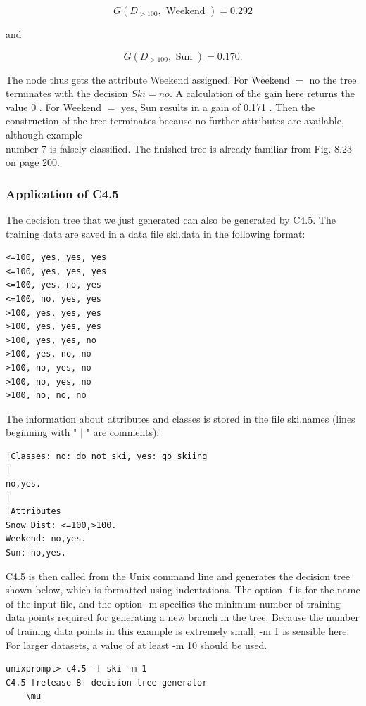 \documentclass[10pt]{book}
\begin{document}
$$
G\left(D_{>100}, \text { Weekend }\right)=0.292
$$

and

$$
G\left(D_{>100}, \text { Sun }\right)=0.170 .
$$

The node thus gets the attribute Weekend assigned. For Weekend $=$ no the tree terminates with the decision $S k i=n o$. A calculation of the gain here returns the value 0 . For Weekend $=$ yes, Sun results in a gain of 0.171 . Then the construction of the tree terminates because no further attributes are available, although example\\
number 7 is falsely classified. The finished tree is already familiar from Fig. 8.23 on page 200.

\subsubsection*{Application of C4.5}
The decision tree that we just generated can also be generated by C4.5. The training data are saved in a data file ski.data in the following format:

\begin{verbatim}
<=100, yes, yes, yes
<=100, yes, yes, yes
<=100, yes, no, yes
<=100, no, yes, yes
>100, yes, yes, yes
>100, yes, yes, yes
>100, yes, yes, no
>100, yes, no, no
>100, no, yes, no
>100, no, yes, no
>100, no, no, no
\end{verbatim}

The information about attributes and classes is stored in the file ski.names (lines beginning with " $\mid$ " are comments):

\begin{verbatim}
|Classes: no: do not ski, yes: go skiing
|
no,yes.
|
|Attributes
Snow_Dist: <=100,>100.
Weekend: no,yes.
Sun: no,yes.
\end{verbatim}

C4.5 is then called from the Unix command line and generates the decision tree shown below, which is formatted using indentations. The option -f is for the name of the input file, and the option -m specifies the minimum number of training data points required for generating a new branch in the tree. Because the number of training data points in this example is extremely small, -m 1 is sensible here. For larger datasets, a value of at least -m 10 should be used.

\begin{verbatim}
unixprompt> c4.5 -f ski -m 1
C4.5 [release 8] decision tree generator
    \mu
\end{verbatim}
\end{document}
